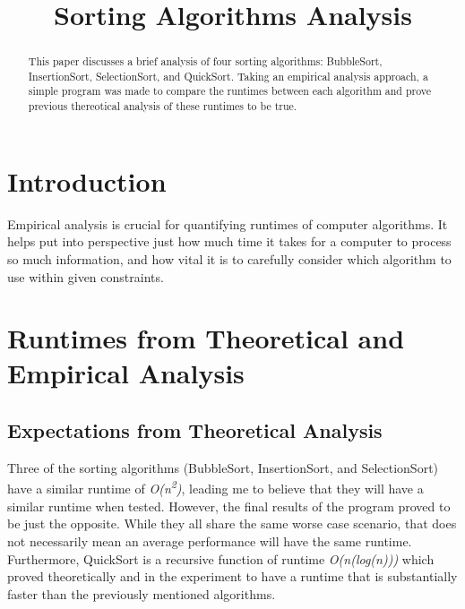 \documentclass[conference]{IEEEtran}
\begin{document}
\title{Sorting Algorithms Analysis\\
}

\author{
}

\maketitle

\begin{abstract}
This paper discusses a brief analysis of four sorting algorithms: BubbleSort, InsertionSort, SelectionSort, and QuickSort. Taking an empirical analysis approach, a simple program was made to compare the runtimes between each algorithm and prove previous thereotical analysis of these runtimes to be true.
\end{abstract}

\section{Introduction}
Empirical analysis is crucial for quantifying runtimes of computer algorithms. It helps put into perspective just how much time it takes for a computer to process so much information, and how vital it is to carefully consider which algorithm to use within given constraints. 

\section{Runtimes from Theoretical and Empirical Analysis}

\subsection{Expectations from Theoretical Analysis}

Three of the sorting algorithms (BubbleSort, InsertionSort, and SelectionSort) have a similar runtime of \textit{O(n\textsuperscript{2})}, leading me to believe that they will have a similar runtime when tested. However, the final results of the program proved to be just the opposite. While they all share the same worse case scenario, that does not necessarily mean an average performance will have the same runtime. Furthermore, QuickSort is a recursive function of runtime \textit{O(n(log(n)))} which proved theoretically and in the experiment to have a runtime that is substantially faster than the previously mentioned algorithms.
\end{document}
